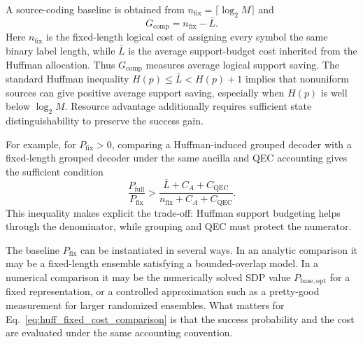 \documentclass[
 reprint,
 amsmath,amssymb,
 aps,
 pra,
 floatfix,
]{revtex4-2}
\begin{document}
A source-coding baseline is obtained from $n_{\mathrm{fix}}=\lceil\log_2M\rceil$ and
\begin{equation}
    G_{\mathrm{comp}}=n_{\mathrm{fix}}-\bar L.
\end{equation}
Here $n_{\mathrm{fix}}$ is the fixed-length logical cost of assigning every symbol the same binary label length, while $\bar L$ is the average support-budget cost inherited from the Huffman allocation. Thus $G_{\mathrm{comp}}$ measures average logical support saving. The standard Huffman inequality $H(p)\le \bar L < H(p)+1$ implies that nonuniform sources can give positive average support saving, especially when $H(p)$ is well below $\log_2M$. Resource advantage additionally requires sufficient state distinguishability to preserve the success gain.

For example, for \(P_{\mathrm{fix}}>0\), comparing a Huffman-induced grouped decoder with a fixed-length grouped decoder under the same ancilla and QEC accounting gives the sufficient condition
\begin{equation}
    \frac{P_{\mathrm{full}}}{P_{\mathrm{fix}}}
    >
    \frac{\bar L+C_A+C_{\mathrm{QEC}}}
    {n_{\mathrm{fix}}+C_A+C_{\mathrm{QEC}}}.
    \label{eq:huff_fixed_cost_comparison}
\end{equation}
This inequality makes explicit the trade-off: Huffman support budgeting helps through the denominator, while grouping and QEC must protect the numerator.

The baseline $P_{\mathrm{fix}}$ can be instantiated in several ways. In an analytic comparison it may be a fixed-length ensemble satisfying a bounded-overlap model. In a numerical comparison it may be the numerically solved SDP value $P_{\mathrm{base,opt}}$ for a fixed representation, or a controlled approximation such as a pretty-good measurement for larger randomized ensembles. What matters for Eq.~\eqref{eq:huff_fixed_cost_comparison} is that the success probability and the cost are evaluated under the same accounting convention.
\end{document}
